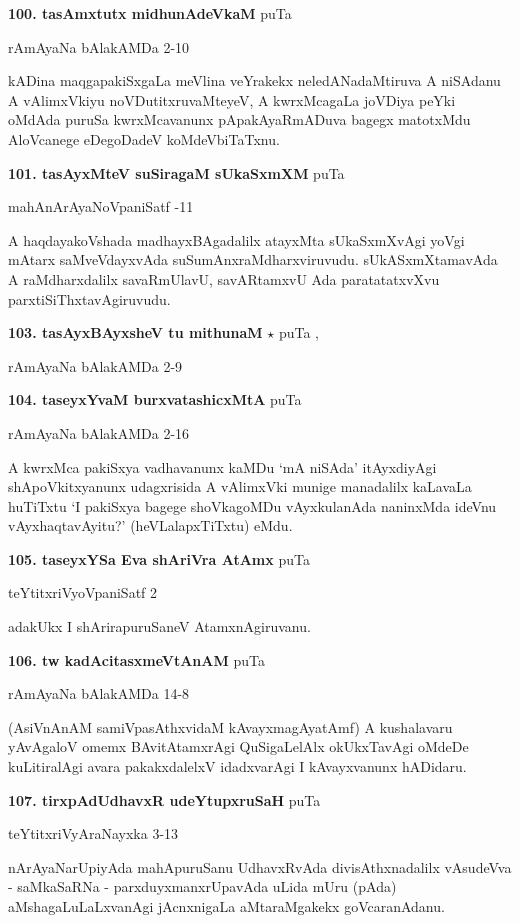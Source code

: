 \medskip
\noindent\textbf{100. tasAmxtutx midhunAdeVkaM} \hfill puTa \pageref{198d}

\hfill rAmAyaNa bAlakAMDa 2-10

kADina maqgapakiSxgaLa meVlina veYrakekx neledANadaMtiruva A niSAdanu A vAlimxVkiyu noVDutitxruvaMteyeV, A kwrxMcagaLa joVDiya peYki oMdAda puruSa kwrxMcavanunx pApakAyaRmADuva bagegx matotxMdu AloVcanege eDegoDadeV koMdeVbiTaTxnu.

\medskip
\noindent\textbf{101. tasAyxMteV suSiragaM sUkaSxmXM} \hfill puTa \pageref{27}

\hfill mahAnArAyaNoVpaniSatf -11

A haqdayakoVshada madhayxBAgadalilx atayxMta sUkaSxmXvAgi yoVgi mAtarx saMveVdayxvAda suSumAnxraMdharxviruvudu. sUkASxmXtamavAda A raMdharxdalilx savaRmUlavU, savARtamxvU Ada paratatatxvXvu parxtiSiThxtavAgiruvudu.

\medskip
\noindent\textbf{103. tasAyxBAyxsheV tu mithunaM} $\star$ \hfill puTa \pageref{156a},\pageref{198a}

\hfill rAmAyaNa bAlakAMDa 2-9

\medskip
\noindent\textbf{104. taseyxYvaM burxvatashicxMtA} \hfill puTa \pageref{201a}

\hfill rAmAyaNa bAlakAMDa 2-16

A kwrxMca pakiSxya vadhavanunx kaMDu `mA niSAda' itAyxdiyAgi shApoVkitxyanunx udagxrisida A vAlimxVki munige manadalilx kaLavaLa huTiTxtu `I pakiSxya bagege shoVkagoMDu vAyxkulanAda naninxMda ideVnu vAyxhaqtavAyitu?' (heVLalapxTiTxtu) eMdu.

\medskip
\noindent\textbf{105. taseyxYSa Eva shAriVra AtAmx} \hfill puTa \pageref{76a}

\hfill teYtitxriVyoVpaniSatf 2

adakUkx I shArirapuruSaneV AtamxnAgiruvanu.

\medskip
\noindent\textbf{106. tw kadAcitasxmeVtAnAM} \hfill puTa \pageref{189}

\hfill rAmAyaNa bAlakAMDa 14-8

(AsiVnAnAM samiVpasAthxvidaM kAvayxmagAyatAmf) A kushalavaru yAvAgaloV omemx BAvitAtamxrAgi QuSigaLelAlx okUkxTavAgi oMdeDe kuLitiralAgi avara pakakxdalelxV idadxvarAgi I kAvayxvanunx hADidaru.

\medskip
\noindent\textbf{107. tirxpAdUdhavxR udeYtupxruSaH} \hfill puTa \pageref{252a}

\hfill teYtitxriVyAraNayxka 3-13

nArAyaNarUpiyAda mahApuruSanu UdhavxRvAda divisAthxnadalilx vAsudeVva - saMkaSaRNa - parxduyxmanxrUpavAda uLida mUru (pAda) aMshagaLuLaLxvanAgi jAcnxnigaLa aMtaraMgakekx goVcaranAdanu. 

